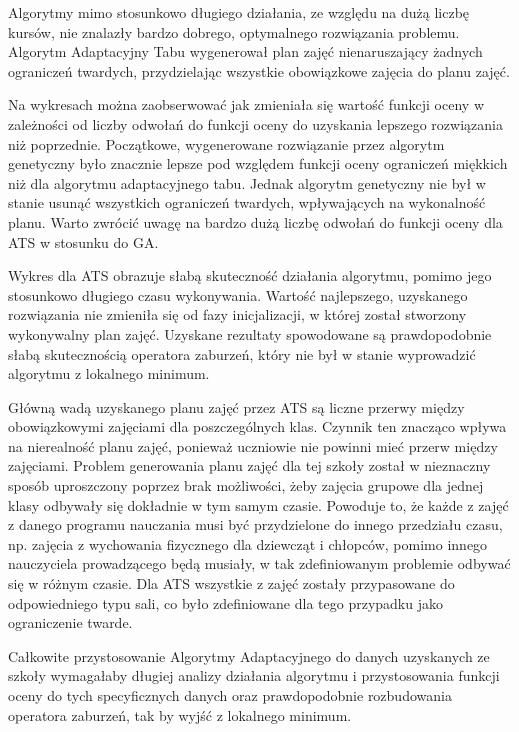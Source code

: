 \par Algorytmy mimo stosunkowo długiego działania, ze względu na dużą liczbę kursów, nie znalazły bardzo dobrego, optymalnego rozwiązania problemu. Algorytm Adaptacyjny Tabu wygenerował plan zajęć nienaruszający żadnych ograniczeń twardych, przydzielając wszystkie obowiązkowe zajęcia do planu zajęć. 
\par Na wykresach można zaobserwować jak zmieniała się wartość funkcji oceny w zależności od liczby odwołań do funkcji oceny do uzyskania lepszego rozwiązania niż poprzednie. Początkowe, wygenerowane rozwiązanie przez algorytm genetyczny było znacznie lepsze pod względem funkcji oceny ograniczeń miękkich niż dla algorytmu adaptacyjnego tabu. Jednak algorytm genetyczny nie był w stanie usunąć wszystkich ograniczeń twardych, wpływających na wykonalność planu. Warto zwrócić uwagę na bardzo dużą liczbę odwołań do funkcji oceny dla ATS w stosunku do GA.
\par Wykres dla ATS obrazuje słabą skuteczność działania algorytmu, pomimo jego stosunkowo długiego czasu wykonywania. Wartość najlepszego, uzyskanego rozwiązania nie zmieniła się od fazy inicjalizacji, w której został stworzony wykonywalny plan zajęć. Uzyskane rezultaty spowodowane są prawdopodobnie słabą skutecznością operatora zaburzeń, który nie był w stanie wyprowadzić algorytmu z lokalnego minimum.
\par Główną wadą uzyskanego planu zajęć przez ATS są liczne przerwy między obowiązkowymi zajęciami dla poszczególnych klas. Czynnik ten znacząco wpływa na nierealność planu zajęć, ponieważ uczniowie nie powinni mieć przerw między zajęciami. Problem generowania planu zajęć dla tej szkoły został w nieznaczny sposób uproszczony poprzez brak możliwości, żeby zajęcia grupowe dla jednej klasy odbywały się dokładnie w tym samym czasie. Powoduje to, że każde z zajęć z danego programu nauczania musi być przydzielone do innego przedziału czasu, np. zajęcia z wychowania fizycznego dla dziewcząt i chłopców, pomimo innego nauczyciela prowadzącego będą musiały, w tak zdefiniowanym problemie odbywać się w różnym czasie. Dla ATS wszystkie z zajęć zostały przypasowane do odpowiedniego typu sali, co było zdefiniowane dla tego przypadku jako ograniczenie twarde.
\par Całkowite przystosowanie Algorytmy Adaptacyjnego do danych uzyskanych ze szkoły wymagałaby długiej analizy działania algorytmu i przystosowania funkcji oceny do tych specyficznych danych oraz prawdopodobnie rozbudowania operatora zaburzeń, tak by wyjść z lokalnego minimum.


